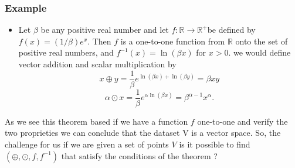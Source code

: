 \documentclass{beamer}
\begin{document}
    \begin{frame}
        \frametitle{Example}
        \begin{itemize}
            \item Let $\beta$ be any positive real number and let $f: \mathbb{R} \rightarrow \mathbb{R}^{+}$be defined by $f(x)=(1 / \beta) e^x$. Then $f$ is a one-to-one function from $\mathbb{R}$ onto the set of positive real numbers, and $f^{-1}(x)=\ln (\beta x)$ for $x>0$. we would define vector addition and scalar multiplication by
            $$ 
            x \oplus y=\frac{1}{\beta} e^{\ln (\beta x)+\ln (\beta y)}=\beta x y
            $$
            $$
            \alpha \odot x=\frac{1}{\beta} e^{\alpha \ln (\beta x)}=\beta^{\alpha-1} x^\alpha.
            $$
            \end{itemize}
    \end{frame}
    \begin{frame}
        As we see this theorem based if we have a function
        $f$ one-to-one and verify the two proprieties we can conclude that the dataset V is a vector space.
        So, the challenge for us if we are given a set of points $V$ is it  possible to 
        find $(\oplus,\odot,f,f^{-1})$ that satisfy the conditions of the theorem ?
    \end{frame}
\end{document}
